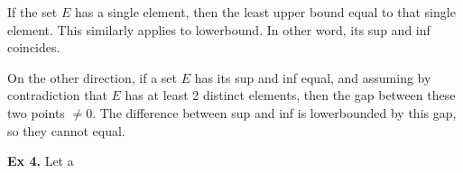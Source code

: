 If the set $E$ has a single element, then the least upper bound equal to that single element. This similarly applies to lowerbound. In other word, its sup and inf coincides.

On the other direction, if a set $E$ has its sup and inf equal, and assuming by contradiction that $E$ has at least 2 distinct elements, then the gap between these two points $\neq 0$. The difference between sup and inf is lowerbounded by this gap, so they cannot equal.

\noindent \textbf{Ex 4.} Let a